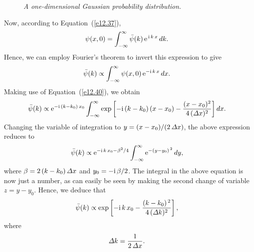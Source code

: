 \begin{figure}
\centerline{}
\caption{\em A one-dimensional Gaussian probability distribution.}\label{f12.3}   
\end{figure}

Now, according to Equation~(\ref{e12.37}), 
\begin{equation}
\psi(x,0) = \int_{-\infty}^{\infty} \bar{\psi}(k)\,{\rm e}^{\,{\rm i}\,k\,x}\,dk.
\end{equation}
Hence, we can employ Fourier's theorem to invert this expression to give
\begin{equation}\label{e12.45}
\bar{\psi}(k)\propto \int_{-\infty}^{\infty} \psi(x,0)\,{\rm e}^{-{\rm i}\,k\,x}\,dx.
\end{equation}
Making use of Equation~(\ref{e12.40}),
we obtain
\begin{equation}
\bar{\psi}(k) \propto
{\rm e}^{-{\rm i}\,(k-k_0)\,x_0}\int_{-\infty}^{\infty} \exp\left[
-{\rm i}\,(k-k_0)\,(x-x_0) - \frac{(x-x_0)^2}{4\,({\mit\Delta}x)^2}\right]dx.
\end{equation}
Changing the variable of integration to $y=(x-x_0)/ (2\,{\mit\Delta} x)$, the above expression reduces to
\begin{equation}
\bar{\psi}(k) \propto {\rm e}^{-{\rm i}\,k\,x_0 - \beta^2/4}\int_{-\infty}^{\infty} {\rm e}^{-(y-y_0)^{\,2}}\,dy,
\end{equation}
where  $\beta = 2\,(k-k_0)\,{\mit\Delta}x$ and
$y_0 = - {\rm i}\,\beta/2$. The integral in the above equation is now just a number,
as can easily be seen by making the second change of variable $z=y-y_0$. 
Hence, we deduce that
\begin{equation}\label{e12.49}
\bar{\psi}(k) \propto \exp\left[-{\rm i}\,k\,x_0 - \frac{(k-k_0)^{\,2}}{4\,({\mit\Delta}k)^2}\right],
\end{equation}
where
\begin{equation}
{\mit\Delta} k = \frac{1}{2\,{\mit\Delta} x}.
\end{equation}

